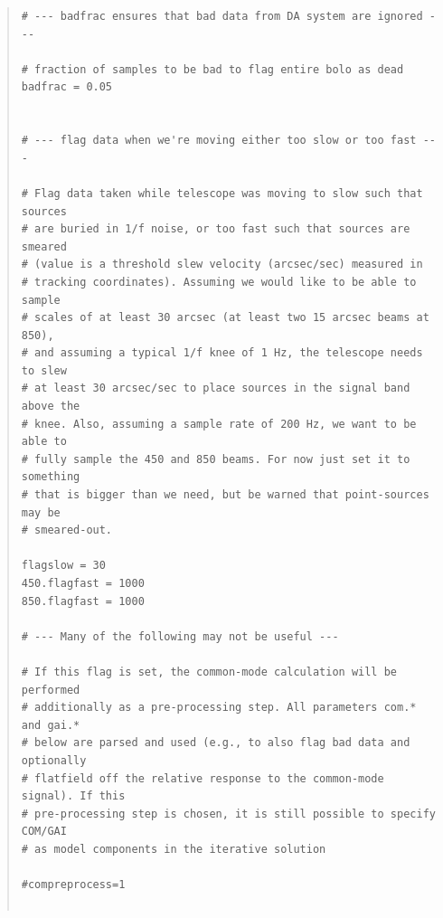 \documentclass[twoside,11pt]{article}
\renewcommand{\_}{\texttt{\symbol{95}}}
\newenvironment{myquote}{\begin{quote}\begin{small}}{\end{small}\end{quote}}
\begin{document}
\begin{myquote}
\begin{verbatim}
# --- badfrac ensures that bad data from DA system are ignored ---

# fraction of samples to be bad to flag entire bolo as dead
badfrac = 0.05


# --- flag data when we're moving either too slow or too fast ---

# Flag data taken while telescope was moving to slow such that sources
# are buried in 1/f noise, or too fast such that sources are smeared
# (value is a threshold slew velocity (arcsec/sec) measured in
# tracking coordinates). Assuming we would like to be able to sample
# scales of at least 30 arcsec (at least two 15 arcsec beams at 850),
# and assuming a typical 1/f knee of 1 Hz, the telescope needs to slew
# at least 30 arcsec/sec to place sources in the signal band above the
# knee. Also, assuming a sample rate of 200 Hz, we want to be able to
# fully sample the 450 and 850 beams. For now just set it to something
# that is bigger than we need, but be warned that point-sources may be
# smeared-out.

flagslow = 30
450.flagfast = 1000
850.flagfast = 1000

# --- Many of the following may not be useful ---

# If this flag is set, the common-mode calculation will be performed
# additionally as a pre-processing step. All parameters com.* and gai.*
# below are parsed and used (e.g., to also flag bad data and optionally
# flatfield off the relative response to the common-mode signal). If this
# pre-processing step is chosen, it is still possible to specify COM/GAI
# as model components in the iterative solution

#compreprocess=1


\end{verbatim}
\end{myquote}
\end{document}

